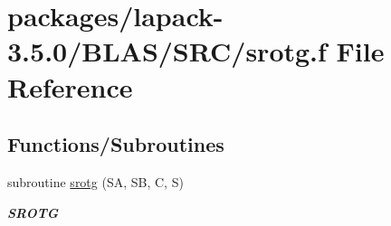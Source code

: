 \hypertarget{lapack-3_85_80_2BLAS_2SRC_2srotg_8f}{}\section{packages/lapack-\/3.5.0/\+B\+L\+A\+S/\+S\+R\+C/srotg.f File Reference}
\label{lapack-3_85_80_2BLAS_2SRC_2srotg_8f}
\subsection*{Functions/\+Subroutines}
\begin{DoxyCompactItemize}
\item 
subroutine \hyperlink{group__single__blas__level1_ga2f65d66137ddaeb7ae93fcc4902de3fc}{srotg} (S\+A, S\+B, C, S)
\begin{DoxyCompactList}\small\item\em {\bfseries S\+R\+O\+T\+G} \end{DoxyCompactList}\end{DoxyCompactItemize}
